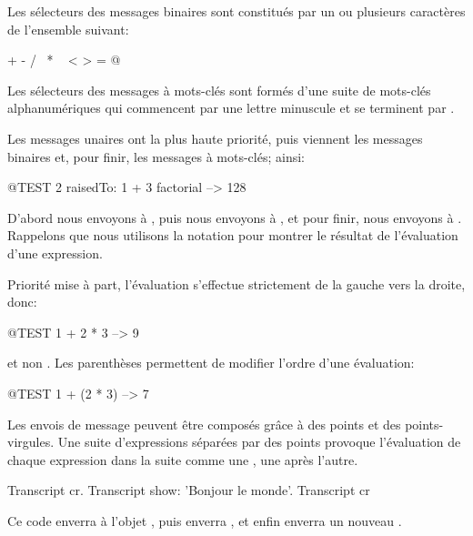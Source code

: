 \documentclass[a4paper,10pt,twoside]{book}
\begin{document}
Les s\'{e}lecteurs des messages binaires sont constitu\'{e}s par un ou plusieurs caract\`{e}res de l'ensemble suivant:
\begin{code}{}
+ - / \ * ~ < > = @ %
\end{code}
\noindent

Les s\'{e}lecteurs des messages \`{a} mots-cl\'{e}s sont form\'{e}s d'une suite de mots-cl\'{e}s alphanum\'{e}riques qui commencent par une lettre minuscule et se terminent par \lct{:}.

Les messages unaires ont la plus haute priorit\'{e}, puis viennent les messages binaires et, pour finir, les messages \`{a} mots-cl\'{e}s; ainsi:
\begin{code}{@TEST}
2 raisedTo: 1 + 3 factorial --> 128
\end{code}
D'abord nous envoyons  \`{a} , puis nous envoyons  \`{a} , et pour finir, nous envoyons  \`{a} .  
Rappelons que nous utilisons la notation \ct{-->} pour montrer le r\'{e}sultat de l'\'{e}valuation d'une expression. 

Priorit\'{e} mise \`{a} part, l'\'{e}valuation s'effectue strictement de la gauche vers la droite, donc: 
\begin{code}{@TEST}
1 + 2 * 3 --> 9
\end{code}
et non .
Les parenth\`{e}ses permettent de modifier l'ordre d'une \'{e}valuation:
\begin{code}{@TEST}
1 + (2 * 3) --> 7
\end{code}
Les envois de message peuvent \^{e}tre compos\'{e}s gr\^{a}ce \`{a} des points et des points-virgules. Une suite d'expressions s\'{e}par\'{e}es par des points provoque  l'\'{e}valuation de chaque expression dans la suite comme une , une apr\`{e}s l'autre. 

\begin{code}{}
Transcript cr.
Transcript show: 'Bonjour le monde'.
Transcript cr
\end{code}

\noindent
Ce code enverra  \`{a} l'objet , puis
enverra  , et enfin enverra un nouveau .
\end{document}
